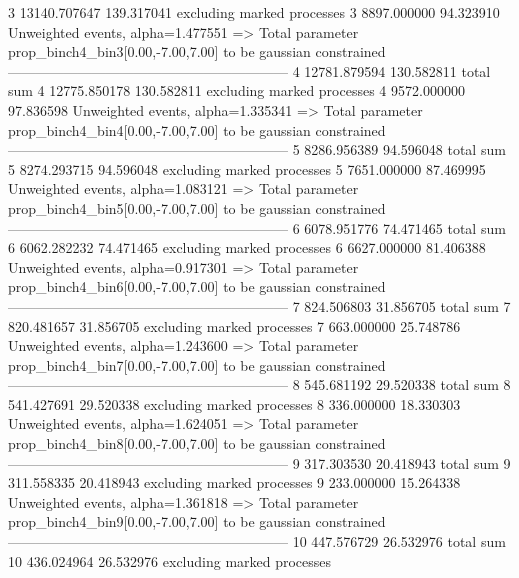 3          13140.707647    139.317041      excluding marked processes    
3          8897.000000     94.323910       Unweighted events, alpha=1.477551
  => Total parameter prop_binch4_bin3[0.00,-7.00,7.00] to be gaussian constrained
------------------------------------------------------------
4          12781.879594    130.582811      total sum                     
4          12775.850178    130.582811      excluding marked processes    
4          9572.000000     97.836598       Unweighted events, alpha=1.335341
  => Total parameter prop_binch4_bin4[0.00,-7.00,7.00] to be gaussian constrained
------------------------------------------------------------
5          8286.956389     94.596048       total sum                     
5          8274.293715     94.596048       excluding marked processes    
5          7651.000000     87.469995       Unweighted events, alpha=1.083121
  => Total parameter prop_binch4_bin5[0.00,-7.00,7.00] to be gaussian constrained
------------------------------------------------------------
6          6078.951776     74.471465       total sum                     
6          6062.282232     74.471465       excluding marked processes    
6          6627.000000     81.406388       Unweighted events, alpha=0.917301
  => Total parameter prop_binch4_bin6[0.00,-7.00,7.00] to be gaussian constrained
------------------------------------------------------------
7          824.506803      31.856705       total sum                     
7          820.481657      31.856705       excluding marked processes    
7          663.000000      25.748786       Unweighted events, alpha=1.243600
  => Total parameter prop_binch4_bin7[0.00,-7.00,7.00] to be gaussian constrained
------------------------------------------------------------
8          545.681192      29.520338       total sum                     
8          541.427691      29.520338       excluding marked processes    
8          336.000000      18.330303       Unweighted events, alpha=1.624051
  => Total parameter prop_binch4_bin8[0.00,-7.00,7.00] to be gaussian constrained
------------------------------------------------------------
9          317.303530      20.418943       total sum                     
9          311.558335      20.418943       excluding marked processes    
9          233.000000      15.264338       Unweighted events, alpha=1.361818
  => Total parameter prop_binch4_bin9[0.00,-7.00,7.00] to be gaussian constrained
------------------------------------------------------------
10         447.576729      26.532976       total sum                     
10         436.024964      26.532976       excluding marked processes    
